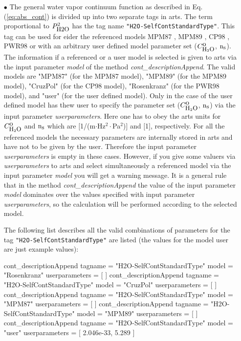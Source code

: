 \begin{itemize}
\item[$\bullet$] The general water vapor continuum function
as described in Eq. (\ref{eq:abs_cont}) is divided up into 
two separate tags in arts. The term proportional 
to $P_{\mbox{\rm \small H2O}}^2$ has the tag name {\tt "H2O-SelfContStandardType"}. 
This tag can be used for eider the referenced models 
MPM87 \citep{liebeandlayton:87}, MPM89 \citep{liebe:89}, 
CP98 \citep{cruzpol:98}, PWR98 \citep{pwr:98} or with
an arbitrary user defined model parameter set ($C^{\mbox{\rm o}}_{\mbox{\rm \small H}_{2}\mbox{\rm \small O}}$, ${\rm n}_{\mbox{\rm \small s}}$).
The information if a referenced or a user model is selected 
is given to arts via the input parameter {\it model} of the 
method {\it cont\_descriptionAppend}. The valid models are
"MPM87" (for the MPM87 model), "MPM89" (for the MPM89 model), 
"CruzPol" (for the CP98 model), "Rosenkranz" (for the PWR98 model), 
and "user"  (for the user defined model). Only in the case 
of the user defined model has thew user to specify the 
parameter set ($C^{\mbox{\rm o}}_{\mbox{\rm \small H}_{2}\mbox{\rm \small O}}$, ${\rm n}_{\mbox{\rm \small s}}$) via the input parameter 
{\it userparameters}. Here one has to obey the arts units for 
$C^{\mbox{\rm o}}_{\mbox{\rm \small H}_{2}\mbox{\rm \small O}}$ and ${\rm n}_{\mbox{\rm \small s}}$ which are $[$1/(m$\cdot$Hz$^2\cdot$Pa$^2$)$]$ and 
$[$1$]$, respectively. For all the referenced models the necessary
parameters are internally stored in arts and have not to be given by
the user. Therefore the input parameter {\it userparameters} is empty
in these cases. However, if you give some valuers via 
{\it userparameters} to arts and select simultaneously a 
referenced model via the input parameter {\it model} you will get 
a warning message. It is a general rule that in the method 
{\it cont\_descriptionAppend} the value of the input 
parameter {\it model} dominates over the values specified with 
input parameter {\it userparameters}, so the calculation will be
performed according to the selected model.

The following list describes all the valid combinations of parameters for the
tag {\tt "H2O-SelfContStandardType"} are listed (the values for the 
model user are just example values): 
\begin{code}
cont_descriptionAppend{
    tagname        = "H2O-SelfContStandardType"
    model          = "Rosenkranz"
    userparameters = [ ]
}
cont_descriptionAppend{
    tagname        = "H2O-SelfContStandardType"
    model          = "CruzPol"
    userparameters = [ ]
}
cont_descriptionAppend{
    tagname        = "H2O-SelfContStandardType"
    model          = "MPM87"
    userparameters = [ ]
}
cont_descriptionAppend{
    tagname        = "H2O-SelfContStandardType"
    model          = "MPM89"
    userparameters = [ ]
}
cont_descriptionAppend{
    tagname        = "H2O-SelfContStandardType"
    model          = "user"
    userparameters = [ 2.046e-33, 5.289 ]
}
\end{code}



\end{itemize}
